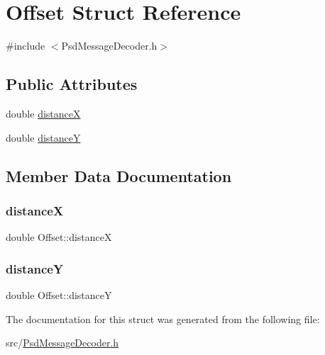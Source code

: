 \hypertarget{struct_offset}{}\section{Offset Struct Reference}
\label{struct_offset}


{\ttfamily \#include $<$Psd\+Message\+Decoder.\+h$>$}

\subsection*{Public Attributes}
\begin{DoxyCompactItemize}
\item 
double \hyperlink{struct_offset_a4868c959df9fac5ae40007d1c785c779}{distanceX}
\item 
double \hyperlink{struct_offset_a80f61e3d41190c73ddd23084b35a4d93}{distanceY}
\end{DoxyCompactItemize}


\subsection{Member Data Documentation}
\mbox{\label{struct_offset_a4868c959df9fac5ae40007d1c785c779}} 
\subsubsection{\texorpdfstring{distanceX}{distanceX}}
{\footnotesize\ttfamily double Offset\+::distanceX}

\mbox{\label{struct_offset_a80f61e3d41190c73ddd23084b35a4d93}} 
\subsubsection{\texorpdfstring{distanceY}{distanceY}}
{\footnotesize\ttfamily double Offset\+::distanceY}



The documentation for this struct was generated from the following file\+:\begin{DoxyCompactItemize}
\item 
src/\hyperlink{_psd_message_decoder_8h}{Psd\+Message\+Decoder.\+h}\end{DoxyCompactItemize}
